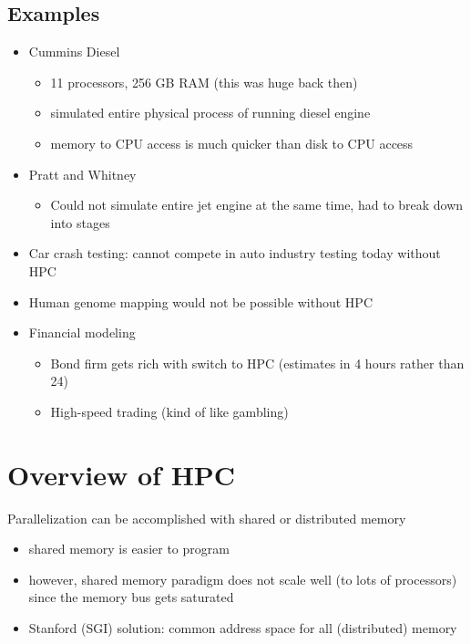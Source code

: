 \documentclass[10pt]{article}
\newenvironment{mitemize}
{
  \begin{itemize}
  \setlength{\itemsep}{1pt}
  \setlength{\parskip}{0pt}
  \setlength{\parsep}{0pt}}{\end{itemize}
}
\begin{document}
  \subsection{Examples}
  \begin{mitemize}
    \item Cummins Diesel
    \begin{mitemize}
      \item 11 processors, 256 GB RAM (this was huge back then)
      \item simulated entire physical process of running diesel engine
      \item memory to CPU access is much quicker than disk to CPU access
    \end{mitemize}
    \item Pratt and Whitney
    \begin{mitemize}
      \item Could not simulate entire jet engine at the same time, had to break down into stages
    \end{mitemize}
    \item Car crash testing: cannot compete in auto industry testing today without HPC
    \item Human genome mapping would not be possible without HPC
    \item Financial modeling
    \begin{mitemize}
      \item Bond firm gets rich with switch to HPC (estimates in 4 hours rather than 24)
      \item High-speed trading (kind of like gambling)
    \end{mitemize}
  \end{mitemize}

\section{Overview of HPC}
Parallelization can be accomplished with shared or distributed memory

\begin{mitemize}
  \item shared memory is easier to program
  \item however, shared memory paradigm does not scale well (to lots of processors) since the memory bus gets saturated
  \item Stanford (SGI) solution: common address space for all (distributed) memory
\end{mitemize}
\end{document}

